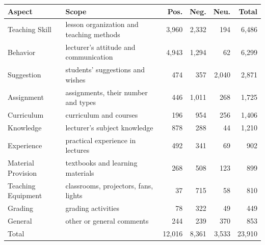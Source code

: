 \begin{tabular}{llrrrr}
\toprule
Aspect & Scope & Pos. & Neg. & Neu. & Total \\
\midrule
Teaching Skill & lesson organization and teaching methods & 3,960 & 2,332 & 194 & 6,486 \\
Behavior & lecturer's attitude and communication & 4,943 & 1,294 & 62 & 6,299 \\
Suggestion & students' suggestions and wishes & 474 & 357 & 2,040 & 2,871 \\
Assignment & assignments, their number and types & 446 & 1,011 & 268 & 1,725 \\
Curriculum & curriculum and courses & 196 & 954 & 256 & 1,406 \\
Knowledge & lecturer's subject knowledge & 878 & 288 & 44 & 1,210 \\
Experience & practical experience in lectures & 492 & 341 & 69 & 902 \\
Material Provision & textbooks and learning materials & 268 & 508 & 123 & 899 \\
Teaching Equipment & classrooms, projectors, fans, lights & 37 & 715 & 58 & 810 \\
Grading & grading activities & 78 & 322 & 49 & 449 \\
General & other or general comments & 244 & 239 & 370 & 853 \\
\midrule
Total & & 12,016 & 8,361 & 3,533 & 23,910 \\
\bottomrule
\end{tabular}
